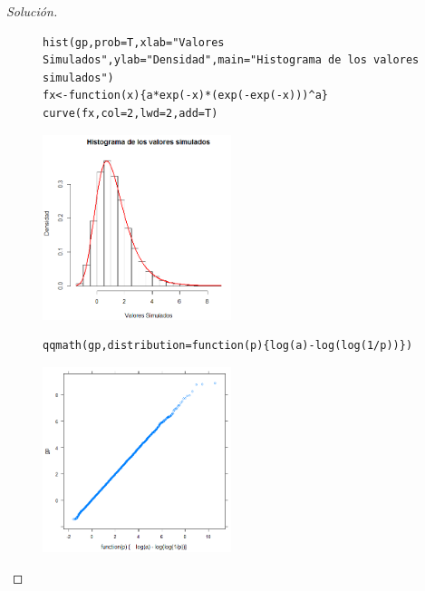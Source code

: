 \documentclass[11pt]{article}
\renewcommand{\=}[1]{\stackrel{#1}{=}} %
\newenvironment{sol}
{\begin{proof}[Solución]}
	{\end{proof}}
\theoremstyle{definition}
\theoremstyle{remark}
\begin{document}
\begin{itemize}
\begin{sol}
\begin{figure}[h]
	\hspace*{0.9cm}\begin{minipage}{10cm}
		{
			\begin{lstlisting}[style=myRstyle, caption={Verificación mediante histograma / GUMBEL POTENCIA.}]
hist(gp,prob=T,xlab="Valores Simulados",ylab="Densidad",main="Histograma de los valores simulados")
fx<-function(x){a*exp(-x)*(exp(-exp(-x)))^a}
curve(fx,col=2,lwd=2,add=T)
			\end{lstlisting}
		}			
	\end{minipage}
	\begin{minipage}{6cm}
		\includegraphics[width=5.5cm]{mi2}
	\end{minipage}
\end{figure}
\begin{figure}[h]
	\hspace*{0.9cm}\begin{minipage}{10cm}
		{
			\begin{lstlisting}[style=myRstyle, caption={Verificación mediante gráfica de cuantiles / GUMBEL POTENCIA.}]
qqmath(gp,distribution=function(p){log(a)-log(log(1/p))})
			\end{lstlisting}
		}			
	\end{minipage}
	\begin{minipage}{6cm}
		\includegraphics[width=5.5cm]{mi3}
	\end{minipage}
\end{figure}


\end{sol}
\end{itemize}
\end{document}
